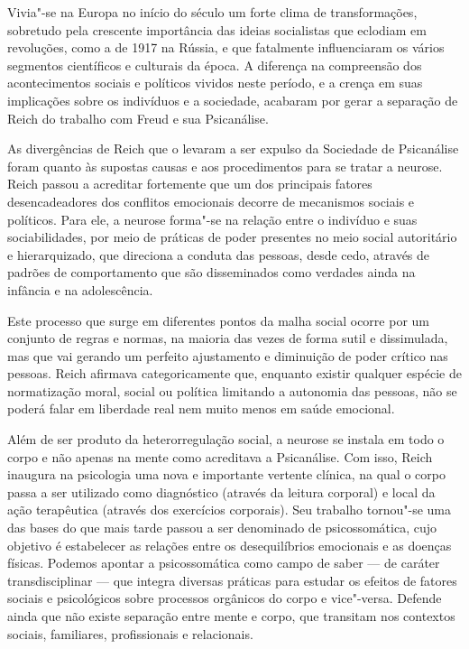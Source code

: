 Vivia"-se na Europa no início do século  um forte clima de
transformações, sobretudo pela crescente importância das ideias
socialistas que eclodiam em revoluções, como a de 1917 na Rússia, e que
fatalmente influenciaram os vários segmentos científicos e culturais da
época. A diferença na compreensão dos acontecimentos sociais e políticos
vividos neste período, e a crença em suas implicações sobre os
indivíduos e a sociedade, acabaram por gerar a separação de Reich do
trabalho com Freud e sua Psicanálise.

As divergências de Reich que o levaram a ser expulso da Sociedade de
Psicanálise foram quanto às supostas causas e aos procedimentos para se
tratar a neurose. Reich passou a acreditar fortemente que um dos
principais fatores desencadeadores dos conflitos emocionais decorre de
mecanismos sociais e políticos. Para ele, a neurose forma"-se na relação
entre o indivíduo e suas sociabilidades, por meio de práticas de poder
presentes no meio social autoritário e hierarquizado, que direciona a
conduta das pessoas, desde cedo, através de padrões de comportamento que
são disseminados como verdades ainda na infância e na adolescência.

Este processo que surge em diferentes pontos da malha social ocorre por
um conjunto de regras e normas, na maioria das vezes de forma sutil e
dissimulada, mas que vai gerando um perfeito ajustamento e diminuição
de poder crítico nas pessoas. Reich afirmava categoricamente que,
enquanto existir qualquer espécie de normatização moral, social ou
política limitando a autonomia das pessoas, não se poderá falar em
liberdade real nem muito menos em saúde emocional.

Além de ser produto da heterorregulação social, a neurose se instala em
todo o corpo e não apenas na mente como acreditava a Psicanálise. Com
isso, Reich inaugura na psicologia uma nova e importante vertente
clínica, na qual o corpo passa a ser utilizado como diagnóstico (através
da leitura corporal) e local da ação terapêutica (através dos exercícios
corporais). Seu trabalho tornou"-se uma das bases do que mais tarde
passou a ser denominado de psicossomática, cujo objetivo é estabelecer
as relações entre os desequilíbrios emocionais e as doenças físicas.
Podemos apontar a psicossomática como campo de saber --- de caráter
transdisciplinar --- que integra diversas práticas para estudar os efeitos
de fatores sociais e psicológicos sobre processos orgânicos do corpo e
vice"-versa. Defende ainda que não existe separação entre mente e corpo,
que transitam nos contextos sociais, familiares, profissionais e
relacionais.

